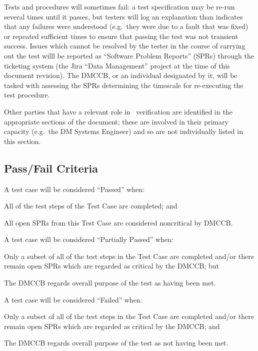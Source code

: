 Tests and procedures will sometimes fail: a test specification may be re-run several times until it passes, but testers will log an explanation than indicates that any failures were understood (e.g.\ they were due to a fault that was fixed) or repeated sufficient times to ensure that passing the test was not transient success.
Issues which cannot be resolved by the tester in the course of carrying out the test willl be reported as ``Software Problem Reports'' (SPRs) through the \product{} ticketing system (the Jira ``Data Management'' project at the time of this document revision).
The DMCCB, or an individual designated by it, will be tasked with assessing the SPRs determining the timescale for re-executing the test procedure.

Other parties that have a relevant role in \product\ verification are identified in the appropriate sections of the document; these are involved in their primary capacity (e.g.\ the DM Systems Engineer) and so are not individually listed in this section.

\subsection{Pass/Fail Criteria}

A test case will be considered ``Passed'' when:

\begin{itemize_single}
\item{All of the test steps of the Test Case are completed; and}
\item{All open SPRs from this Test Case are considered noncritical by DMCCB.}
\end{itemize_single}

A test case will be considered ``Partially Passed'' when:

\begin{itemize_single}
\item{Only a subset of all of the test steps in the Test Case are completed and/or there remain open SPRs which are regarded as critical by the DMCCB; but}
\item{The DMCCB regards overall purpose of the test as having been met.}
\end{itemize_single}

A test case will be considered ``Failed'' when:

\begin{itemize_single}
\item{Only a subset of all of the test steps in the Test Case are completed and/or there remain open SPRs which are regarded as critical by the DMCCB; and}
\item{The DMCCB regards overall purpose of the test as not having been met.}
\end{itemize_single}

